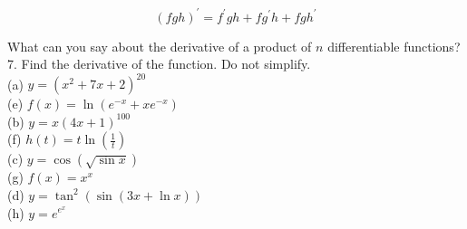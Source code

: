 \documentclass[10pt]{article}
\begin{document}
$$
(f g h)^{\prime}=f^{\prime} g h+f g^{\prime} h+f g h^{\prime}
$$

What can you say about the derivative of a product of $n$ differentiable functions?\\
7. Find the derivative of the function. Do not simplify.\\
(a) $y=\left(x^{2}+7 x+2\right)^{20}$\\
(e) $f(x)=\ln \left(e^{-x}+x e^{-x}\right)$\\
(b) $y=x(4 x+1)^{100}$\\
(f) $h(t)=t \ln \left(\frac{1}{t}\right)$\\
(c) $y=\cos (\sqrt{\sin x})$\\
(g) $f(x)=x^{x}$\\
(d) $y=\tan ^{2}(\sin (3 x+\ln x))$\\
(h) $y=e^{e^{x}}$
\end{document}
